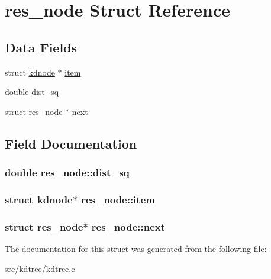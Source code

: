 \hypertarget{structres__node}{}\section{res\+\_\+node Struct Reference}
\label{structres__node}
\subsection*{Data Fields}
\begin{DoxyCompactItemize}
\item 
struct \hyperlink{structkdnode}{kdnode} $\ast$ \hyperlink{structres__node_a6d1e853ec1f48f263c277344f37f8cc3}{item}
\item 
double \hyperlink{structres__node_ac291090c8cb9b8ec553c1eeee9c64882}{dist\+\_\+sq}
\item 
struct \hyperlink{structres__node}{res\+\_\+node} $\ast$ \hyperlink{structres__node_a218ec7f9710d71366f6ee1bcd647897b}{next}
\end{DoxyCompactItemize}


\subsection{Field Documentation}
\hypertarget{structres__node_ac291090c8cb9b8ec553c1eeee9c64882}{}
\subsubsection[{dist\+\_\+sq}]{\setlength{\rightskip}{0pt plus 5cm}double res\+\_\+node\+::dist\+\_\+sq}\label{structres__node_ac291090c8cb9b8ec553c1eeee9c64882}
\hypertarget{structres__node_a6d1e853ec1f48f263c277344f37f8cc3}{}
\subsubsection[{item}]{\setlength{\rightskip}{0pt plus 5cm}struct {\bf kdnode}$\ast$ res\+\_\+node\+::item}\label{structres__node_a6d1e853ec1f48f263c277344f37f8cc3}
\hypertarget{structres__node_a218ec7f9710d71366f6ee1bcd647897b}{}
\subsubsection[{next}]{\setlength{\rightskip}{0pt plus 5cm}struct {\bf res\+\_\+node}$\ast$ res\+\_\+node\+::next}\label{structres__node_a218ec7f9710d71366f6ee1bcd647897b}


The documentation for this struct was generated from the following file\+:\begin{DoxyCompactItemize}
\item 
src/kdtree/\hyperlink{kdtree_8c}{kdtree.\+c}\end{DoxyCompactItemize}
